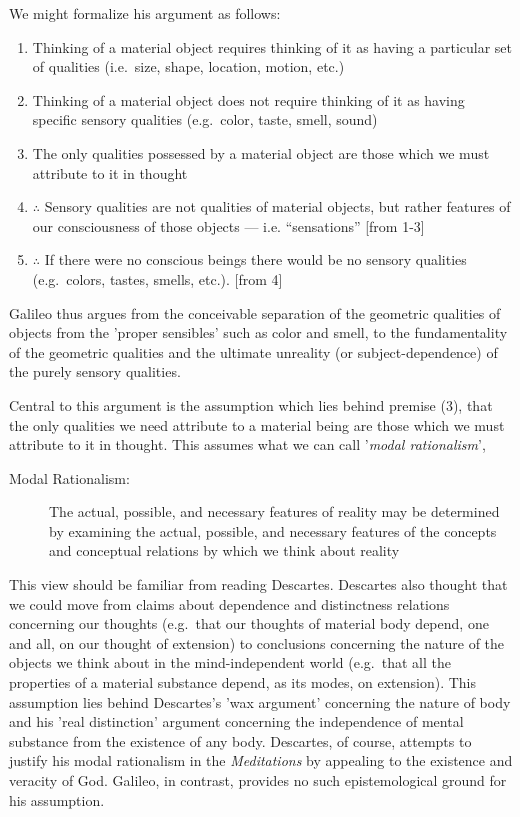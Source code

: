 \documentclass[12pt]{article}
\begin{document}
We might formalize his argument as follows:

\begin{enumerate}
\item Thinking of a material object requires thinking of it as having a
particular set of qualities (i.e. size, shape, location, motion,
etc.)
\item Thinking of a material object does not require thinking of it as
having specific sensory qualities (e.g. color, taste, smell, sound)
\item The only qualities possessed by a material object are those which we
must attribute to it in thought
\item \(\therefore\) Sensory qualities are not qualities of material objects, but rather
features of our consciousness of those objects --- i.e. ``sensations''
[from 1-3]
\item \(\therefore\) If there were no conscious beings there would be no sensory
qualities (e.g. colors, tastes, smells, etc.). [from 4]
\end{enumerate}

Galileo thus argues from the conceivable separation of the geometric
qualities of objects from the 'proper sensibles' such as color and
smell, to the fundamentality of the geometric qualities and the ultimate
unreality (or subject-dependence) of the purely sensory qualities.

Central to this argument is the assumption which lies behind premise
(3), that the only qualities we need attribute to a material being are
those which we must attribute to it in thought. This assumes what we can
call '\emph{modal rationalism}',

\begin{description}
\item[{Modal Rationalism:}] The actual, possible, and necessary features of
reality may be determined by examining the actual, possible, and
necessary features of the concepts and conceptual relations by which
we think about reality
\end{description}

This view should be familiar from reading Descartes. Descartes also
thought that we could move from claims about dependence and distinctness
relations concerning our thoughts (e.g. that our thoughts of material
body depend, one and all, on our thought of extension) to conclusions
concerning the nature of the objects we think about in the
mind-independent world (e.g. that all the properties of a material
substance depend, as its modes, on extension). This assumption lies
behind Descartes's 'wax argument' concerning the nature of body and his
'real distinction' argument concerning the independence of mental
substance from the existence of any body. Descartes, of course, attempts
to justify his modal rationalism in the \emph{Meditations} by appealing to
the existence and veracity of God. Galileo, in contrast, provides no
such epistemological ground for his assumption.
\end{document}
